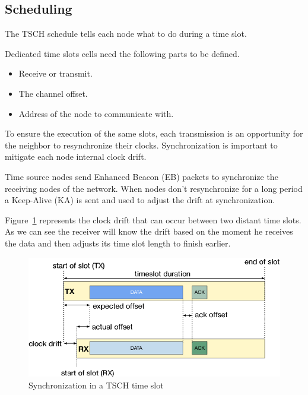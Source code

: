 \subsection{Scheduling}

The TSCH schedule tells each node what to do during a time slot.

Dedicated time slots cells need the following parts to be defined.

\begin{itemize}
  \item Receive or transmit.
  \item The channel offset.
  \item Address of the node to communicate with.
\end{itemize}


To ensure the execution of the same slots, each transmission is an opportunity 
for the neighbor to resynchronize their clocks.
Synchronization is important to mitigate each node internal clock drift.

Time source nodes send Enhanced Beacon (EB) packets to synchronize the receiving
nodes of the network. When nodes don't resynchronize for a long period
a Keep-Alive (KA) is sent and used to adjust the drift at synchronization.

Figure~\ref{fig:sync} represents the clock drift that can occur between two
distant time slots.
As we can see the receiver will know the drift based on the moment he receives
the data and then adjusts its time slot length to finish earlier.

\begin{figure}[H]
  \centering
  \includegraphics[width=\textwidth]{thesis.tex/chapters/context/fig/sync.png}
  \caption{Synchronization in a TSCH time slot\cite{TELESHERMETO201784}\label{fig:sync}}
\end{figure}

